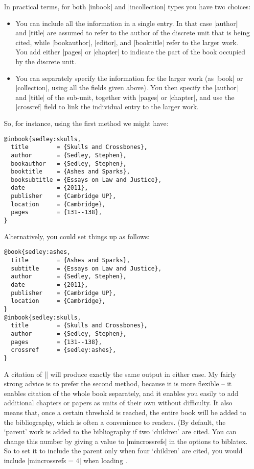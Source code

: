 {In practical terms, for both |inbook| and |incollection| types you have two choices:
\begin{itemize}
\item You can include all the information in a single entry. In that case |author| and |title| are assumed to refer to the author of the discrete unit that is being cited, while |bookauthor|, |editor|, and |booktitle| refer to the larger work. You add either |pages| or |chapter| to indicate the part of the book occupied by the discrete unit.
\item You can separately specify the information for the larger work (as |book| or |collection|, using all the fields given above). You then specify the |author| and |title| of the sub-unit, together with |pages| or |chapter|, and use the |crossref| field to link the individual entry to the larger work.
\end{itemize}

So, for instance, using the first method we might have:
\begin{verbatim}
@inbook{sedley:skulls,
  title        = {Skulls and Crossbones},
  author       = {Sedley, Stephen},
  bookauthor   = {Sedley, Stephen},
  booktitle    = {Ashes and Sparks},
  booksubtitle = {Essays on Law and Justice},
  date         = {2011},
  publisher    = {Cambridge UP},
  location     = {Cambridge},
  pages        = {131--138},
}
\end{verbatim}

Alternatively, you could set things up as follows:
\begin{verbatim}
@book{sedley:ashes,
  title        = {Ashes and Sparks},
  subtitle     = {Essays on Law and Justice},
  author       = {Sedley, Stephen},
  date         = {2011},
  publisher    = {Cambridge UP},
  location     = {Cambridge},
}
@inbook{sedley:skulls,
  title        = {Skulls and Crossbones},
  author       = {Sedley, Stephen},
  pages        = {131--138},
  crossref     = {sedley:ashes},
}
\end{verbatim}

A citation of |\cite{sedley:ashes}| will produce exactly the same output in either case. My fairly strong advice is to prefer the second method, because it is more flexible -- it enables citation of the whole book separately, and it enables you easily to add additional chapters or papers as units of their own without difficulty. It also means that, once a certain threshold is reached, the entire book will be added to the bibliography, which is often a convenience to readers. (By default, the `parent' work is added to the bibliography if two `children' are cited. You can change this number by giving a value to |mincrossrefs| in the options to biblatex. So to set it to include the parent only when four `children' are cited, you would include |mincrossrefs = 4| when loading \biblatex.

}
